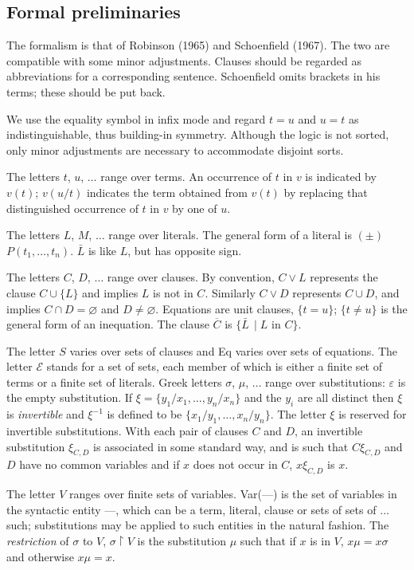 \documentclass[letterpaper]{report}
\begin{document}
\subsection*{Formal preliminaries}\label{formal-preliminaries}

The formalism is that of Robinson (1965) and Schoenfield (1967). The two
are compatible with some minor adjustments. Clauses should be regarded
as abbreviations for a corresponding sentence. Schoenfield omits
brackets in his terms; these should be put back.

We use the equality symbol in infix mode and regard $t = u$ and
$u = t$ as indistinguishable, thus building-in symmetry. Although the
logic is not sorted, only minor adjustments are necessary to accommodate
disjoint sorts.

The letters $t$, $u$, $\ldots$ range over terms. An occurrence of
$t$ in $v$ is indicated by $v(t)$; $v(u/t)$ indicates the term
obtained from $v(t)$ by replacing that distinguished occurrence of
$t$ in $v$ by one of $u$.

The letters $L$, $M$, $\ldots$ range over literals. The general
form of a literal is $(\pm)$$P(t_{1},\ldots,t_{n})$. $\bar{L}$ is
like $L$, but has opposite sign.

The letters $C$, $D$, $\ldots$ range over clauses. By convention,
$C \lor L$ represents the clause $C\cup\{L\}$ and implies $L$ is
not in $C$. Similarly $C\lor D$ represents $C\cup D$, and implies
$C\cap D = \varnothing$ and $D \neq \varnothing$. Equations are unit
clauses, $\{t = u\}$; $\{t \neq u\}$ is the general form of an
inequation. The clause $\overline{C}$ is $\{\bar{L}\,\mid L$ in
$C\}$.

The letter $S$ varies over sets of clauses and Eq varies over sets of
equations. The letter $\mathcal{E}$ stands for a set of sets, each
member of which is either a finite set of terms or a finite set of
literals. Greek letters $\sigma$, $\mu$, $\ldots$ range over
substitutions: $\varepsilon$ is the empty substitution. If
$\xi = \{y_{1}/x_{1},\ldots,y_{n}/x_{n}\}$ and the $y_{i}$ are all
distinct then $\xi$ is \emph{invertible} and $\xi^{-1}$ is defined
to be $\{x_{1}/y_{1},\ldots,x_{n}/y_{n}\}$. The letter $\xi$ is
reserved for invertible substitutions. With each pair of clauses $C$
and $D$, an invertible substitution $\xi_{C,D}$ is associated in
some standard way, and is such that $C\xi_{C,D}$ and $D$ have no
common variables and if $x$ does not occur in $C$, $x\xi_{C,D}$ is
$x$.

The letter $V$ ranges over finite sets of variables. Var(---) is
the set of variables in the syntactic entity ---, which can be a
term, literal, clause or sets of sets of $\ldots$ such; substitutions
may be applied to such entities in the natural fashion. The
\emph{restriction} of $\sigma$ to $V$, $\sigma \upharpoonright V$ is the
substitution $\mu$ such that if $x$ is in $V$, $x\mu = x\sigma$
and otherwise $x\mu = x$.
\end{document}
